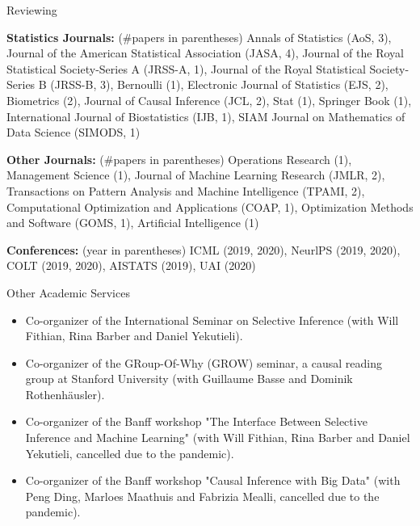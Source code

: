 \documentclass{article}
\begin{document}


\vspace{5mm}
\begin{large}
\noindent Reviewing
\end{large}

\vspace{2mm}
\noindent \textbf{Statistics Journals: }(\#papers in parentheses) Annals of Statistics (AoS, 3), Journal of the American Statistical Association (JASA, 4), Journal of the Royal Statistical Society-Series A (JRSS-A, 1), Journal of the Royal Statistical Society-Series B (JRSS-B, 3), Bernoulli (1), Electronic Journal of Statistics (EJS, 2), Biometrics (2), Journal of Causal Inference (JCL, 2), Stat (1), Springer Book (1), International Journal of Biostatistics (IJB, 1), SIAM Journal on Mathematics of Data Science (SIMODS, 1)

\vspace{2mm}
\noindent \textbf{Other Journals: }(\#papers in parentheses) Operations Research (1), Management Science (1), Journal of Machine Learning Research (JMLR, 2), Transactions on Pattern Analysis and Machine Intelligence (TPAMI, 2), Computational Optimization and Applications (COAP, 1), Optimization Methods and Software (GOMS, 1), Artificial Intelligence (1)

\vspace{2mm}
\noindent \textbf{Conferences: }(year in parentheses) ICML (2019, 2020), NeurlPS (2019, 2020), COLT (2019, 2020), AISTATS (2019), UAI (2020)

\vspace{5mm}
\begin{large}
\noindent Other Academic Services
\end{large}

\begin{itemize}
\item Co-organizer of the International Seminar on Selective Inference (with Will Fithian, Rina Barber and Daniel Yekutieli).
\item Co-organizer of the GRoup-Of-Why (GROW) seminar, a causal reading group at Stanford University (with Guillaume Basse and Dominik Rothenhäusler).
\item Co-organizer of the Banff workshop "The Interface Between Selective Inference and Machine Learning" (with Will Fithian, Rina Barber and Daniel Yekutieli, cancelled due to the pandemic).
\item Co-organizer of the Banff workshop "Causal Inference with Big Data" (with Peng Ding, Marloes Maathuis and Fabrizia Mealli, cancelled due to the pandemic).
\end{itemize}
\end{document}
